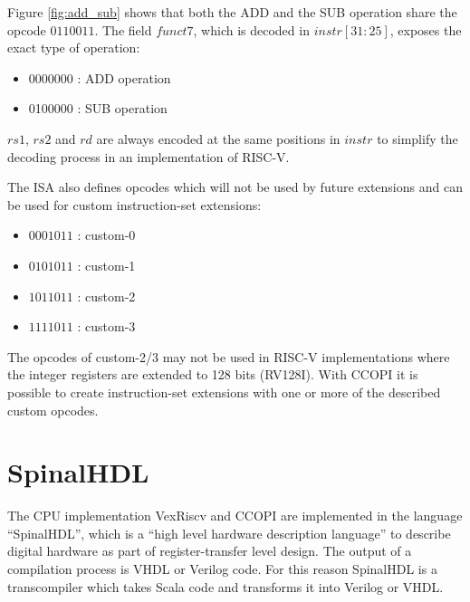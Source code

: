 \documentclass[twoside,twocolumn]{article}
\begin{document}
\noindent Figure \ref*{fig:add_sub} shows that both the ADD and the SUB
operation share the opcode $0110011$. The field $funct7$, which is
decoded in $instr[31:25]$, exposes the exact type of operation:
\begin{itemize}
    \item 0000000 : ADD operation
    \item 0100000 : SUB operation
\end{itemize}
$rs1$, $rs2$ and $rd$ are always encoded at the same positions
in $instr$ to simplify the decoding process in an implementation of
RISC-V.

The ISA also defines opcodes which will not be used by future extensions
and can be used for custom instruction-set extensions:
    \begin{itemize}
        \item $0001011$ : custom-0
        \item $0101011$ : custom-1
        \item $1011011$ : custom-2
        \item $1111011$ : custom-3
    \end{itemize}
The opcodes of custom-2/3 may not be used in RISC-V implementations where the
integer registers are extended to 128 bits (RV128I). With CCOPI it is
possible to create instruction-set extensions with one or more of the described 
custom opcodes.
\section{SpinalHDL}
The CPU implementation VexRiscv and CCOPI are implemented in the
language ``SpinalHDL'', which is a ``high level hardware description
language'' to describe digital hardware as part of register-transfer
level design. The output of a compilation process is VHDL or
Verilog code. For this reason SpinalHDL is a transcompiler which takes
Scala code and transforms it into Verilog or VHDL.  
\end{document}
